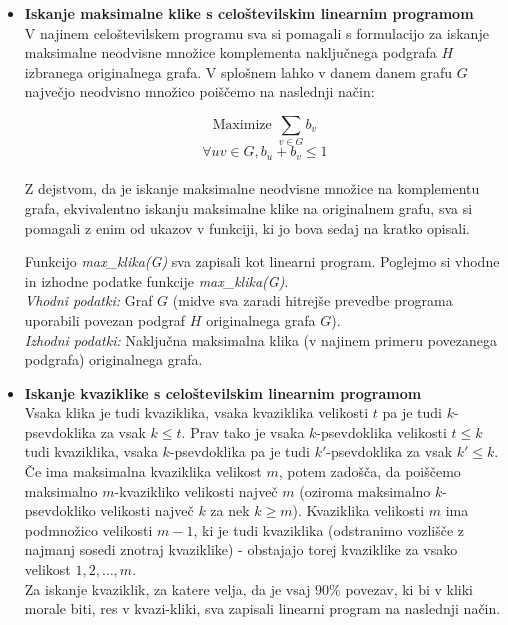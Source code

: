 \documentclass[12pt,a4paper]{amsart}
\theoremstyle{definition}
\theoremstyle{plain}
\begin{document}
\begin{itemize}
\item \textbf{Iskanje maksimalne klike s celoštevilskim linearnim programom}
\\

V najinem celoštevilskem programu sva si pomagali s formulacijo za iskanje maksimalne neodvisne množice komplementa naključnega podgrafa $H$ izbranega originalnega grafa. V splošnem lahko v danem danem grafu $G$ največjo neodvisno množico poiščemo na naslednji način:

 $$\text{Maximize }\sum_{v\in G}b_v$$ $$\forall uv \in G, b_u + b_v \le 1$$\\

Z dejstvom, da je iskanje maksimalne neodvisne množice na komplementu grafa, ekvivalentno iskanju maksimalne klike na originalnem grafu, sva si pomagali z enim od ukazov v funkciji, ki jo bova sedaj na kratko opisali. 
 
Funkcijo \textit{max\_klika(G)} sva zapisali kot linearni program. Poglejmo si vhodne in izhodne podatke funkcije \textit{max\_klika(G)}.
\\

\textit{Vhodni podatki:} Graf $G$ (midve sva zaradi hitrejše prevedbe programa uporabili povezan podgraf $H$ originalnega grafa $G$).
\\

\textit{Izhodni podatki:} Naključna maksimalna klika (v najinem primeru povezanega podgrafa) originalnega grafa.
\\

\item \textbf{Iskanje kvaziklike s celoštevilskim linearnim programom}
\\

Vsaka klika je tudi kvaziklika, vsaka kvaziklika velikosti $t$ pa je tudi $k$-psevdoklika za vsak $k \le  t$. Prav tako je vsaka $k$-psevdoklika velikosti $t \le k$ tudi kvaziklika, vsaka $k$-psevdoklika pa je tudi $k'$-psevdoklika za vsak $k' \le k$. 
\\
Če ima maksimalna kvaziklika velikost $m$, potem zadošča, da poiščemo maksimalno $m$-kvazikliko velikosti največ $m$ (oziroma maksimalno $k$-psevdokliko velikosti največ $k$ za nek $k \geq m$). Kvaziklika velikosti $m$ ima podmnožico velikosti $m-1$, ki je tudi kvaziklika (odstranimo vozlišče z najmanj sosedi znotraj kvaziklike) - obstajajo torej kvaziklike za vsako velikost $1, 2, \ldots, m$.
\\

Za iskanje kvaziklik, za katere velja, da je vsaj $90\%$ povezav, ki bi v kliki morale biti, res v kvazi-kliki, sva zapisali linearni program na naslednji način. \\


\end{itemize}
\end{document}
